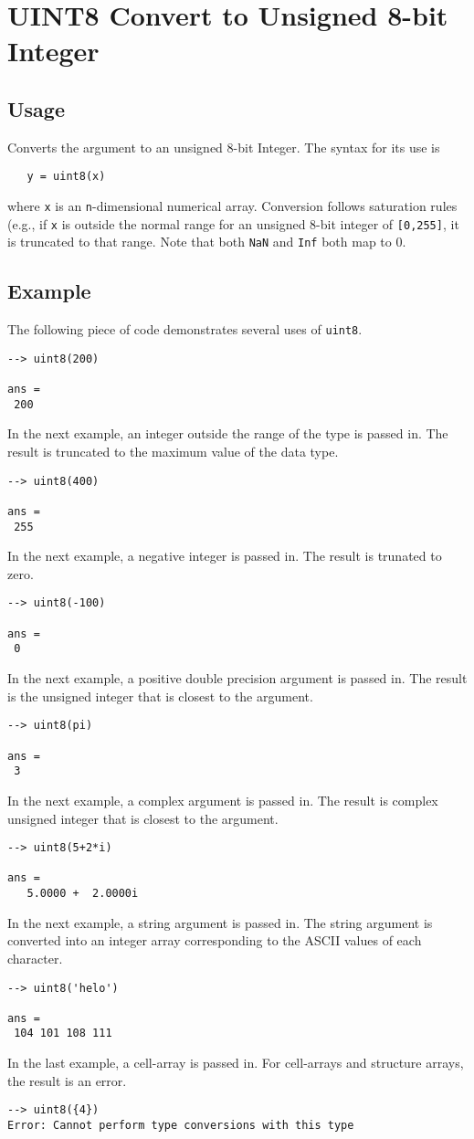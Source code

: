 \section{UINT8 Convert to Unsigned 8-bit Integer}

\subsection{Usage}

Converts the argument to an unsigned 8-bit Integer.  The syntax
for its use is
\begin{verbatim}
   y = uint8(x)
\end{verbatim}
where \verb|x| is an \verb|n|-dimensional numerical array.  Conversion
follows saturation rules (e.g., if \verb|x| is outside the normal
range for an unsigned 8-bit integer of \verb|[0,255]|, it is truncated 
to that range. Note that
both \verb|NaN| and \verb|Inf| both map to 0.
\subsection{Example}

The following piece of code demonstrates several uses of \verb|uint8|.
\begin{verbatim}
--> uint8(200)

ans = 
 200 
\end{verbatim}
In the next example, an integer outside the range  of the type is passed in.  
The result is truncated to the maximum value of the data type.
\begin{verbatim}
--> uint8(400)

ans = 
 255 
\end{verbatim}
In the next example, a negative integer is passed in.  The result is 
trunated to zero.
\begin{verbatim}
--> uint8(-100)

ans = 
 0 
\end{verbatim}
In the next example, a positive double precision argument is passed in.  
The result is the unsigned integer that is closest to the argument.
\begin{verbatim}
--> uint8(pi)

ans = 
 3 
\end{verbatim}
In the next example, a complex argument is passed in.  The result is 
complex unsigned integer that is closest to the argument.
\begin{verbatim}
--> uint8(5+2*i)

ans = 
   5.0000 +  2.0000i 
\end{verbatim}
In the next example, a string argument is passed in.  The string argument 
is converted into an integer array corresponding to the ASCII values of each character.
\begin{verbatim}
--> uint8('helo')

ans = 
 104 101 108 111 
\end{verbatim}
In the last example, a cell-array is passed in.  For cell-arrays and 
structure arrays, the result is an error.
\begin{verbatim}
--> uint8({4})
Error: Cannot perform type conversions with this type
\end{verbatim}
